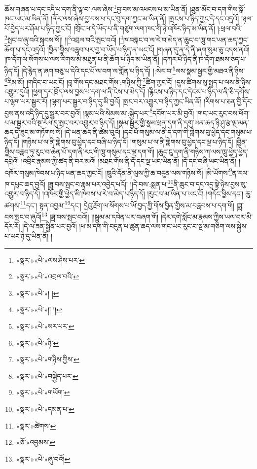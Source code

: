 ཆོས་གཞན་པ་དང་འདི་པ་དག་ནི་ལྟ་བ་:ལས་ཞེས་\footnote{«སྣར་»«པེ་»ལས་ཤེས་པར་}བྱ་བས་མ་འཕངས་པ་མ་ཡིན་ནོ། །ཐུན་མོང་བ་དག་གིས་སྒོ་ཁང་ཡང་མ་ཡིན་ནོ། །ནོར་ལས་ཞེས་བྱ་བས་ཕ་དང་བུ་དག་ཀྱང་མ་ཡིན་ནོ། །སྤངས་པ་ཉིད་ཀྱང་དེ་དང་འདྲའོ། །ཉལ་པོ་བྱེད་པར་ཤོམ་པ་ཉིད་ཀྱང་ངོ། །གྲོང་ལ་དེ་ཡོད་པ་ནི་གཙུག་ལག་ཁང་གི་ཉེ་འཁོར་ཉིད་མ་ཡིན་ནོ། །:ཕྲལ་བའི་\footnote{«སྣར་»«པེ་»འབྲལ་བའི་}སྤང་བ་ཞུ་བའི་སྐབས་སོ།། །།\footnote{«སྣར་»«པེ་»། །}འབྲལ་བའི་སྤང་བའོ། །\footnote{«སྣར་»«པེ་»།། །།}ཁ་བསྐང་བ་ལ་རེ་བ་མེད་ན་ཆུང་བ་ཁྲུ་གང་ཡན་ཆད་ཀྱང་ཆོག་པ་དང་འདྲའོ། །བྱིན་གྱིས་བརླབ་པར་བྱ་བ་ཡོད་པ་ཉིད་ན་ཡང་ངོ། །གཞན་དུ་ན་དེ་ནི་ཞག་སུམ་ཅུ་འདས་ནའོ། །ཁ་དོག་ལ་སོགས་པ་ལས་རིགས་མི་མཐུན་པ་ནི་ཆོག་པ་ཉིད་མ་ཡིན་ནོ། །དཀར་པོ་ཉིད་ནི་ཁ་དོག་ཐམས་ཅད་པ་ཉིད་དོ། །དེ་རྙེད་ན་ཞག་བཅུ་པ་དེའི་དང་པོ་ལ་བག་ལ་གློན་པ་ཉིད་དོ། །:སེར་བ་\footnote{«སྣར་»«པེ་»སར་པར་}ལས་སྣམ་སྦྱར་གྱི་མཐའ་ནི་ཉིས་\footnote{«སྣར་»«པེ་»ཉི་}རིམ་མོ། །གདིང་བ་ཡང་ངོ། །བླ་གོས་དང་མཐང་གོས་:གཉིས་ཀྱི་\footnote{«སྣར་»«པེ་»གཉིས་ཀྱིས་}ཚིག་ཀྱང་ངོ། །དུས་ཚིགས་སུ་སྤྱད་པ་ལས་ནི་ཉིས་འགྱུར་དུའོ། །ཕྱག་དར་ཁྲོད་ལས་བྱས་པ་དག་ལ་ནི་ངེས་པ་མེད་དོ། །རྙིངས་པ་ཉིད་དང་དེངས་པ་ཉིད་ལ་ནི་ཅི་དགོས་པ་ལྷག་པར་སྦྱར་རོ། །ལྷག་པར་སྦྱར་བ་ཉིད་དུ་མི་བྱའོ། །སྤང་བར་འགྱུར་བ་ཉིད་ཀྱང་ཡིན་ནོ། །རིགས་པ་ཅན་བྱི་དོར་བྱས་ནས་འདི་ཉིད་དུ་སྦྱར་བར་བྱའོ། །སྙམ་པའི་སེམས་མ་:སྐྱེད་པར་\footnote{«སྣར་»«པེ་»བསྐྱེད་པར་}དབོག་པར་མི་བྱའོ། །གང་ཡང་རུང་བས་ཕོག་པ་མ་སྦྱར་བའི་སྔ་རོལ་དུ་སྤང་བར་འགྱུར་བ་ཉིད་དོ། །སྣམ་སྦྱར་གྱི་སྣམ་ཕྲན་དག་ནི་དགུ་ཡན་ཆད་ཉི་ཤུ་རྩ་ལྔ་མན་ཆད་དེ་ཟུང་མ་གཏོགས་སོ། །དེ་ཡན་ཆད་ནི་ཚེམ་བུའོ། །དང་པོ་གསུམ་ལ་ནི་དེ་དག་གི་གླེགས་བུ་ཕྱེད་དང་གསུམ་པ་ཉིད་དོ། །གཉིས་པ་ལ་ནི་གླེགས་བུ་ཕྱེད་དང་བཞི་པ་ཉིད་དོ། །གསུམ་པ་ལ་ནི་གླེགས་བུ་ཕྱེད་དང་ལྔ་པ་ཉིད་དོ། །བྱིན་གྱིས་བརླབ་ཏུ་རུང་བ་ཆེན་པོ་དག་ནི་རང་གི་ཁྲུ་གསུམ་དང་ལྔ་དག་གོ། །ཆུང་ངུ་དག་ནི་གཉིས་ཀ་ལས་ཁྲུ་ཕྱེད་ཕྱེད་དབྲིའོ། །འབྲིང་རྣམས་ཀྱི་ཚད་ནི་བར་མའོ། །མཐང་གོས་ནི་དོ་དང་ལྔ་ཡང་ཡིན་ནོ། །དོ་དང་བཞི་ཡང་ཡིན་ནོ། །འཁོར་གསུམ་ཁེབས་པ་ཉིད་ཡན་ཆད་ཀྱང་ངོ། །ཁྲུའི་དོན་ནི་ལུས་ཀྱི་ཆ་བདུན་ལས་གཉིས་སོ། །མི་ཡོགས་\footnote{«སྣར་»«པེ་»གཡོག་}ན་རལ་ཁ་དཔུང་ཆད་བྱའོ། །ཟླ་བས་སྤང་བ་རྣམ་པར་འབྱེད་པའོ།། །།དེ་བས་:སྨན་པ་\footnote{«སྣར་»«པེ་»དམན་པ་}ནི་ཆུང་བ་དང་འདྲ་སྟེ་ཉེས་བྱས་སུ་འགྱུར་བ་ཉིད་དོ། །འཁོར་གྱི་ཕྱེད་མི་ཁེབས་པ་རེ་བ་མེད་པ་ཉིད་དོ། །རུང་བ་མ་ཡིན་པ་ཡང་ངོ། །གདོང་ཕྱིས་དང་། ཆུ་ཚགས་\footnote{«སྣར་»ཚེགས་}དང་། སྟན་འབྱམ་\footnote{«ཅོ་»འབྱམས་}དང་། དྲེའུ་རྔོག་ལ་སོགས་པ་ཡོ་བྱད་ཀྱི་གོས་བྱིན་གྱིས་མ་བརླབས་པ་དག་གོ། །ཟླ་བས་སྤང་བ་ཞུའོ།\footnote{«སྣར་»«པེ་»ཞུ་བའོ།} །ཟླ་བས་སྤང་བའོ།། །།སྦྲུམ་མ་དབེན་པར་བཞག་གོ། །དེར་དགེ་སློང་མ་རྣམས་ཀྱིས་ཡལ་བར་མི་དོར་རོ། །དེ་ལ་ཟན་སྦྱིན་པར་བྱའོ། །ཕ་མ་དག་གི་བདུན་པ་ཚུན་ཆད་ལས་གང་ཡང་རུང་བ་སྔ་མ་གཅིག་ལས་སྐྱེས་པ་ཡང་ཉེ་དུ་ཡིན་ནོ། །
